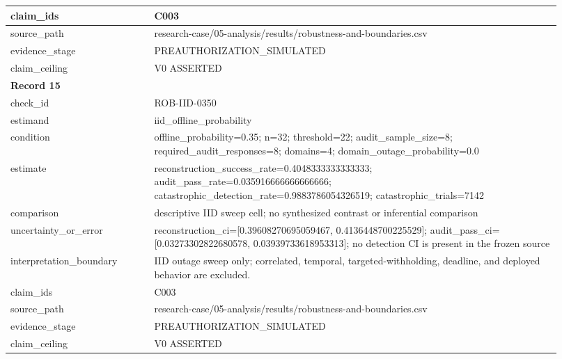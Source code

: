 \begin{longtable}{|p{0.24\linewidth}|p{0.68\linewidth}|}
claim\_\allowbreak{}ids & C003 \\ \hline
source\_\allowbreak{}path & research-case/05-analysis/results/robustness-and-boundaries.csv \\ \hline
evidence\_\allowbreak{}stage & PREAUTHORIZATION\_\allowbreak{}SIMULATED \\ \hline
claim\_\allowbreak{}ceiling & V0 ASSERTED \\ \hline
\multicolumn{2}{|l|}{\textbf{Record 15}} \\ \hline
check\_\allowbreak{}id & ROB-IID-0350 \\ \hline
estimand & iid\_\allowbreak{}offline\_\allowbreak{}probability \\ \hline
condition & offline\_\allowbreak{}probability=0.35;\allowbreak{} n=32;\allowbreak{} threshold=22;\allowbreak{} audit\_\allowbreak{}sample\_\allowbreak{}size=8;\allowbreak{} required\_\allowbreak{}audit\_\allowbreak{}responses=8;\allowbreak{} domains=4;\allowbreak{} domain\_\allowbreak{}outage\_\allowbreak{}probability=0.0 \\ \hline
estimate & reconstruction\_\allowbreak{}success\_\allowbreak{}rate=0.4048333333333333;\allowbreak{} audit\_\allowbreak{}pass\_\allowbreak{}rate=0.035916666666666666;\allowbreak{} catastrophic\_\allowbreak{}detection\_\allowbreak{}rate=0.9883786054326519;\allowbreak{} catastrophic\_\allowbreak{}trials=7142 \\ \hline
comparison & descriptive IID sweep cell;\allowbreak{} no synthesized contrast or inferential comparison \\ \hline
uncertainty\_\allowbreak{}or\_\allowbreak{}error & reconstruction\_\allowbreak{}ci=[0.39608270695059467, 0.4136448700225529];\allowbreak{} audit\_\allowbreak{}pass\_\allowbreak{}ci=[0.03273302822680578, 0.03939733618953313];\allowbreak{} no detection CI is present in the frozen source \\ \hline
interpretation\_\allowbreak{}boundary & IID outage sweep only;\allowbreak{} correlated, temporal, targeted-withholding, deadline, and deployed behavior are excluded. \\ \hline
claim\_\allowbreak{}ids & C003 \\ \hline
source\_\allowbreak{}path & research-case/05-analysis/results/robustness-and-boundaries.csv \\ \hline
evidence\_\allowbreak{}stage & PREAUTHORIZATION\_\allowbreak{}SIMULATED \\ \hline
claim\_\allowbreak{}ceiling & V0 ASSERTED \\ \hline

\end{longtable}
